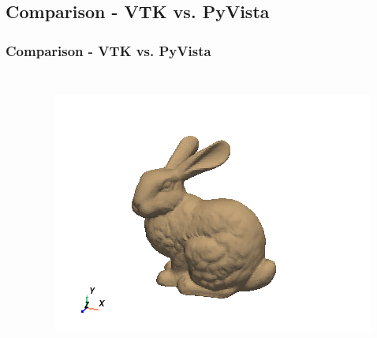 \documentclass[t]{beamer}
\begin{document}
\subsection{Comparison - VTK vs. PyVista}
\begin{frame}
  \frametitle{Comparison - VTK vs. PyVista}
  \begin{columns}[T]
    \begin{column}{.5\textwidth}
      \vspace{-15pt}
      \inputminted[fontsize=\footnotesize]{python}{code/vtk_example.py}
    \end{column}

    \begin{column}{.5\textwidth}
      \vspace{-15pt}
      \inputminted[fontsize=\footnotesize]{python}{code/pv_example.py}
      \vspace{-5pt}
      \includegraphics[width=\textwidth]{figures/pv_example.png}
    \end{column}
  \end{columns}

\end{frame}

\end{document}
